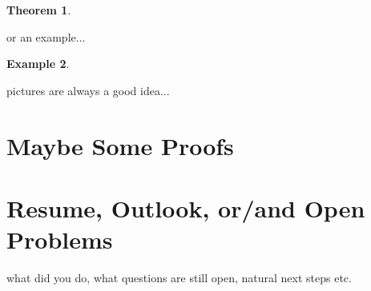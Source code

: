 \documentclass[12pt]{amsart}
\numberwithin{equation}{section}
\newtheorem{thm}{Theorem}
\theoremstyle{definition}
\newtheorem{example}[thm]{Example}
\numberwithin{thm}{section}
\begin{document}
\begin{thm}

\end{thm}

or an example...
\begin{example}

\end{example}

pictures are always a good idea...



\newpage
\section{Maybe Some Proofs}


\newpage
\section{Resume, Outlook, or/and Open Problems}
\label{Sec:Outlook}


what did you do, what questions are still open, natural next steps etc. 



\newpage


\end{document}
